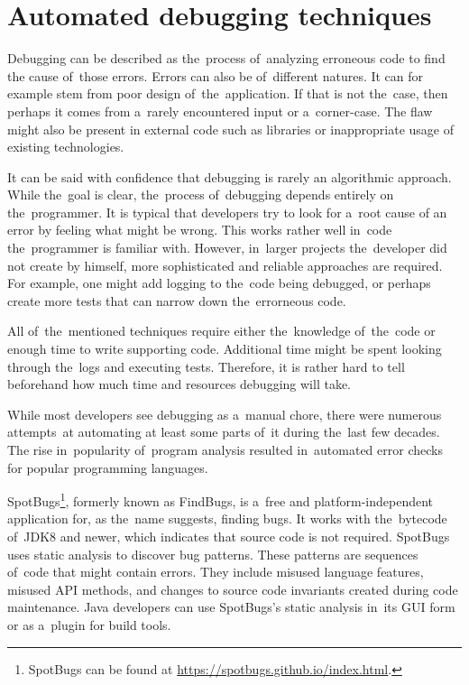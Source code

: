 \chapter{Automated debugging techniques}


Debugging can be described as the~process of~analyzing erroneous code to find 
the cause of~those errors. 
Errors can also be of~different natures.
It can for example stem from poor design of~the~application.
If that is not the~case, then perhaps it comes from a~rarely
encountered input or a~corner-case. 
The flaw might also be present
in external code such as libraries or inappropriate usage of
existing technologies.

It can be said with confidence that debugging is rarely an algorithmic
app\-roach.
While the~goal is clear, the~process of~debugging depends entirely 
on the~programmer.
It is typical that developers try to look for a~root cause
of an error by feeling what might be wrong.
This works rather well in~code the~programmer is familiar with.
However, in~larger projects the~developer did not create by himself,
more sophisticated and reliable approaches are required.
For example, one might add logging to the~code being debugged,
or perhaps create more tests that can narrow down the~errorneous code.

All of~the~mentioned techniques require either the~knowledge of~the~code 
or enough time to write supporting code. Additional time might be spent
looking through the~logs and executing tests. Therefore, it is rather
hard to tell be\-fore\-hand how much time and resources debugging will take.

While most developers see debugging as a~manual chore, there were numerous 
attempts~at automating at least some parts of~it during the~last few decades. 
The rise in~popularity of~program analysis resulted in~automated error checks 
for popular programming languages. 

SpotBugs\footnote{SpotBugs can be found at 
\url{https://spotbugs.github.io/index.html}.}, formerly known as FindBugs, 
is a~free and platform-inde\-pen\-dent application for, as the~name 
suggests, finding bugs.
It works with the~bytecode of~JDK8 and newer, which indicates that source 
code is not required.
SpotBugs uses static analysis to discover bug patterns.
These patterns are sequences of~code that might contain errors.
They include misused language features, misused API methods, and changes to 
source code invariants created during code maintenance.
Java developers can use SpotBugs's static analysis in~its GUI form or 
as a~plugin for build tools.

